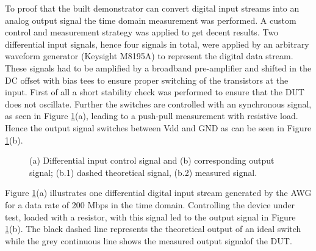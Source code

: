 \documentclass[journal]{IEEEtran}
\begin{document}
To proof that the built demonstrator can convert digital input streams into an analog output signal the time domain measurement was performed.
A custom control and measurement strategy was applied to get decent results.
Two differential input signals, hence four signals in total, were applied by an arbitrary waveform generator (Keysight M8195A) to represent the digital data stream. 
These signals had to be amplified by a broadband pre-amplifier and shifted in the DC offset with bias tees to ensure proper switching of the transistors at the input.
%
First of all a short stability check was performed to ensure that the DUT does not oscillate.
Further the switches are controlled with an synchronous signal, as seen in Figure \ref{fig:meas_Input_Output_RLoad_100M_SmallSize_Paper}(a), leading to a push-pull measurement with resistive load.
Hence the output signal switches between Vdd and GND as can be seen in Figure \ref{fig:meas_Input_Output_RLoad_100M_SmallSize_Paper}(b).
%
\begin{figure}[htb]
  \centering
	\begin{scriptsize}
  	\def\svgwidth{\columnwidth}
 	 
  	\caption{(a) Differential input control signal and (b) corresponding output signal; (b.1) dashed theoretical signal, (b.2) measured signal.}
  	\label{fig:meas_Input_Output_RLoad_100M_SmallSize_Paper}
	\end{scriptsize}
\end{figure}
%
Figure \ref{fig:meas_Input_Output_RLoad_100M_SmallSize_Paper}(a) illustrates one differential digital input stream generated by the AWG for a data rate of 200 Mbps in the time domain.
Controlling the device under test, loaded with a resistor, with this signal led to the output signal in Figure \ref{fig:meas_Input_Output_RLoad_100M_SmallSize_Paper}(b).
The black dashed line represents the theoretical output of an ideal switch while the grey continuous line shows the measured output signalof the DUT.
\end{document}

